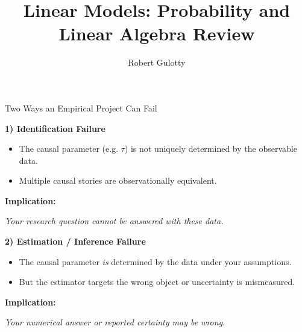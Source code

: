 \documentclass[aspectratio=169, handout, t]{beamer}
\title[PLSC 30700]{Linear Models: Probability and Linear Algebra Review}
\author{Robert Gulotty}
\institute[Chicago]{University of Chicago}
\numberwithin{equation}{section}
\begin{document}
\begin{frame}
\maketitle
\end{frame}

\begin{frame}{Two Ways an Empirical Project Can Fail}

\vspace{0.2cm}

\textbf{1) Identification Failure}

\begin{itemize}
    \item The causal parameter (e.g. $\tau$) is not uniquely determined by the observable data.
    \item Multiple causal stories are observationally equivalent.
\end{itemize}

\vspace{0.2cm}

\textbf{Implication:}
\begin{center}
\emph{Your research question cannot be answered with these data.}
\end{center}

\vspace{0.5cm}

\textbf{2) Estimation / Inference Failure}

\begin{itemize}
    \item The causal parameter \emph{is} determined by the data under your assumptions.
    \item But the estimator targets the wrong object or uncertainty is mismeasured.
\end{itemize}

\vspace{0.2cm}

\textbf{Implication:}
\begin{center}
\emph{Your numerical answer or reported certainty may be wrong.}
\end{center}

\end{frame}
\end{document}
